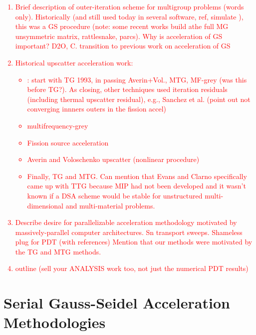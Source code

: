 \documentclass[preprint,10pt]{elsarticle}
\newcommand{\tcr}[1]{\textcolor{red}{#1}}
\begin{document}
\tcr
{
\begin{enumerate}
\item Brief description of outer-iteration scheme for multigroup problems (words only). Historically (and still used today in several software, ref, simulate ), this was a GS procedure (note: some recent works build athe full MG unsymmetric matrix, rattlesnake, parcs). Why is acceleration of GS important? D2O, C.
transition to previous work on acceleration of GS
\item Historical upscatter acceleration work:
\begin{itemize}
\item: start with TG 1993, in passing Averin+Vol., MTG, MF-grey (was this before TG?). As closing, other techniques used iteration residuals (including thermal upscatter residual), e.g., Sanchez et al. (point out not converging innners outers in the fission accel)
\item multifrequency-grey
\item Fission source acceleration
\item Averin and Voloschenko upscatter (nonlinear procedure)
\item Finally, TG and MTG. Can mention that Evans and Clarno specifically came up with TTG because MIP had not been developed and it wasn't known if a DSA scheme would be stable for unstructured multi-dimensional and multi-material problems.
\end{itemize}
\item Describe desire for parallelizable acceleration methodology motivated by massively-parallel computer architectures. Sn transport sweeps. Shameless plug for PDT (with references)  Mention that our methods were motivated by the TG and MTG methods.
\item outline (sell your ANALYSIS work too, not just the numerical PDT results)
\end{enumerate}
}

\section{Serial Gauss-Seidel Acceleration Methodologies} \label{sec::GS}

\end{document}
